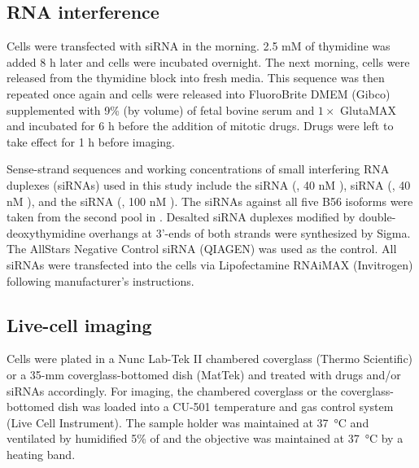 \subsection{RNA interference}
Cells were transfected with siRNA in the morning. 2.5 mM of thymidine was added 8 h later and cells were incubated overnight. The next morning, cells were released from the thymidine block into fresh media. This sequence was then repeated once again and cells were released into FluoroBrite\texttrademark{} DMEM (Gibco) supplemented with 9\% (by volume) of fetal bovine serum and $1\times$ GlutaMAX and incubated for 6 h before the addition of mitotic drugs. Drugs were left to take effect for 1 h before imaging.

Sense-strand sequences and working concentrations of small interfering RNA duplexes (siRNAs) used in this study include the  siRNA (, 40 nM \cite{siBUBR1}),  siRNA (, 40 nM \cite{BUB1-si5}), and the  siRNA (, 100 nM \cite{BUBR1_XenopusVSHeLa}). The siRNAs against all five B56 isoforms were taken from the second pool in \cite{siB56s}.
Desalted siRNA duplexes modified by double-deoxythymidine overhangs at 3'-ends of both strands were synthesized by Sigma. The AllStars Negative Control siRNA (QIAGEN) was used as the control. All siRNAs were transfected into the cells via Lipofectamine RNAiMAX (Invitrogen) following manufacturer’s instructions.

\subsection{Live-cell imaging}
Cells were plated in a Nunc Lab-Tek II chambered coverglass (Thermo Scientific) or a 35-mm coverglass-bottomed dish (MatTek) and treated with drugs and/or siRNAs accordingly. For imaging, the chambered coverglass or the coverglass-bottomed dish was loaded into a CU-501 temperature and gas control system (Live Cell Instrument). The sample holder was maintained at \SI{37}{\celsius} and ventilated by humidified 5\% of  and the objective was maintained at \SI{37}{\celsius} by a heating band.

